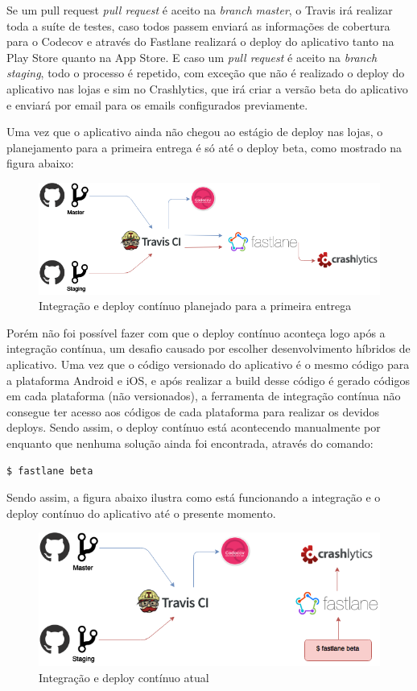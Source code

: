 Se um pull request \textit{pull request} é aceito na \textit{branch} \textit{master}, o Travis irá realizar toda a suíte de testes, caso todos passem enviará as informações de cobertura para o
Codecov e através do Fastlane realizará o deploy do aplicativo tanto na Play Store quanto na App Store. E caso um \textit{pull request} é aceito na \textit{branch} \textit{staging}, todo o processo é repetido, com exceção
que não é realizado o deploy do aplicativo nas lojas e sim no Crashlytics, que irá criar a versão beta do aplicativo e enviará por email para os emails configurados previamente.

Uma vez que o aplicativo ainda não chegou ao estágio de deploy nas lojas, o planejamento para a primeira entrega é só até o deploy beta, como mostrado na figura abaixo:

\begin{figure}[H]
    \centering
    \includegraphics[scale=0.5]{figuras/ci_as_is.png}
    \caption[Integração e deploy contínuo planejado para o APP]{Integração e deploy contínuo planejado para a primeira entrega}
    \label{img:integracao_deploy_continuo_planejado_primeira_entrega}
\end{figure}

Porém não foi possível fazer com que o deploy contínuo aconteça logo após a integração contínua, um desafio causado por escolher desenvolvimento híbridos de aplicativo.
Uma vez que o código versionado do aplicativo é o mesmo código para a plataforma Android e iOS, e após realizar a build desse código é gerado códigos em cada plataforma (não versionados),
a ferramenta de integração contínua não consegue ter acesso aos códigos de cada plataforma para realizar os devidos deploys. Sendo assim, o deploy contínuo está acontecendo manualmente
por enquanto que nenhuma solução ainda foi encontrada, através do comando:

\begin{lstlisting}[language=bash]
  $ fastlane beta
\end{lstlisting}

Sendo assim, a figura abaixo ilustra como está funcionando a integração e o deploy contínuo do aplicativo até o presente momento.

\begin{figure}[H]
    \centering
    \includegraphics[scale=0.5]{figuras/ci_currently.png}
    \caption[Integração e deploy contínuo atual]{Integração e deploy contínuo atual}
    \label{img:integracao_deploy_continuo_atual}
\end{figure}
